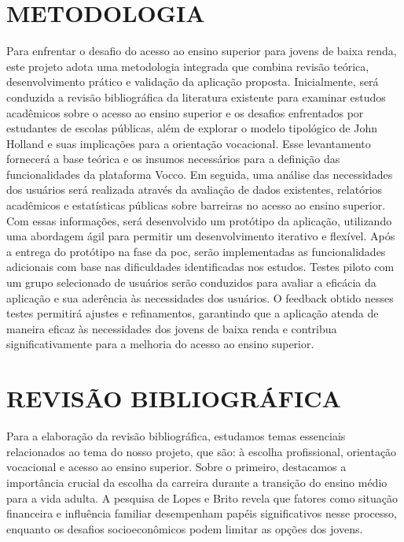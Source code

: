 
\chapter{METODOLOGIA}
\label{fases-da-disciplina}

Para enfrentar o desafio do acesso ao ensino superior para jovens de baixa renda, este projeto adota uma metodologia integrada que combina revisão teórica, desenvolvimento prático e validação da aplicação proposta. Inicialmente, será conduzida a revisão bibliográfica da literatura existente para examinar estudos acadêmicos sobre o acesso ao ensino superior e os desafios enfrentados por estudantes de escolas públicas, além de explorar o modelo tipológico de John Holland e suas implicações para a orientação vocacional. Esse levantamento fornecerá a base teórica e os insumos necessários para a definição das funcionalidades da plataforma Vocco. Em seguida, uma análise das necessidades dos usuários será realizada através da avaliação de dados existentes, relatórios acadêmicos e estatísticas públicas sobre barreiras no acesso ao ensino superior. Com essas informações, será desenvolvido um protótipo da aplicação, utilizando uma abordagem ágil para permitir um desenvolvimento iterativo e flexível. Após a entrega do protótipo na fase da \ac{poc}, serão implementadas as funcionalidades adicionais com base nas dificuldades identificadas nos estudos. Testes piloto com um grupo selecionado de usuários serão conduzidos para avaliar a eficácia da aplicação e sua aderência às necessidades dos usuários. O feedback obtido nesses testes permitirá ajustes e refinamentos, garantindo que a aplicação atenda de maneira eficaz às necessidades dos jovens de baixa renda e contribua significativamente para a melhoria do acesso ao ensino superior.

\chapter{REVISÃO BIBLIOGRÁFICA}

Para a elaboração da revisão bibliográfica, estudamos temas essenciais relacionados ao tema do nosso projeto, que são: à escolha profissional, orientação vocacional e acesso ao ensino superior. Sobre o primeiro, destacamos a importância crucial da escolha da carreira durante a transição do ensino médio para a vida adulta. A pesquisa de Lopes e Brito revela que fatores como situação financeira e influência familiar desempenham papéis significativos nesse processo, enquanto os desafios socioeconômicos podem limitar as opções dos jovens.

